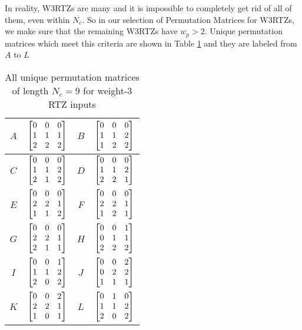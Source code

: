 In reality, W3RTZs are many and it is impossible to completely get rid of all of them, even within $N_c$. So in our selection of Permutation Matrices for W3RTZs, we make sure that the remaining W3RTZs have $w_p>2$. 
Unique permutation matrices which meet this criteria are shown in Table \ref{tb2} and they are labeled from $A$ to $L$

\begin{table}[h!]
\centering
\begin{tabular}{|c || c  |c  ||c  |} 
 \hline
 $A$ & $\begin{bmatrix} 0 & 0 & 0 \cr 1 & 1 & 1 \cr 2 & 2 & 2\end{bmatrix}$ 
  &
 $B$ & $\begin{bmatrix}0 & 0 & 0 \cr 1 & 1 & 2 \cr 1 & 2 & 2\end{bmatrix}$\\ 
 \hline
$C$ & $\begin{bmatrix}0 & 0 & 0 \cr 1 & 1 & 2 \cr 2 & 1 & 2\end{bmatrix}$ 
 &
$D$ & $\begin{bmatrix}0 & 0 & 0 \cr 1 & 1 & 2 \cr 2 & 2 & 1\end{bmatrix}$\\ 
 \hline
 $E$ & $\begin{bmatrix}0 & 0 & 0 \cr 2 & 2 & 1 \cr 1 & 1 & 2\end{bmatrix}$ 
 &
 $F$ & $\begin{bmatrix}0 & 0 & 0 \cr 2 & 2 & 1 \cr 1 & 2 & 1\end{bmatrix}$\\ 
 \hline
 $G$ & $\begin{bmatrix}0 & 0 & 0 \cr 2 & 2 & 1 \cr 2 & 1 & 1\end{bmatrix}$ 
 &
  $H$ & $\begin{bmatrix}0 & 0 & 1 \cr 0 & 1 & 1 \cr 2 & 2 & 2\end{bmatrix}$\\ 
 \hline
  $I$ & $\begin{bmatrix}0 & 0 & 1 \cr 1 & 1 & 2 \cr 2 & 0 & 2\end{bmatrix}$ 
 &
 $J$ & $\begin{bmatrix}0 & 0 & 2 \cr 0 & 2 & 2 \cr 1 & 1 & 1\end{bmatrix}$\\ 
 \hline
  $K$ & $\begin{bmatrix}0 & 0 & 2 \cr 2 & 2 & 1 \cr 1 & 0 & 1\end{bmatrix}$
 &
  $L$ & $\begin{bmatrix}0 & 1 & 0 \cr 1 & 1 & 2 \cr 2 & 0 & 2\end{bmatrix}$\\ 
 \hline
\end{tabular}
\caption{All unique permutation matrices of length $N_c =9$ for weight-$3$ RTZ inputs}
\label{tb2}
\end{table}

